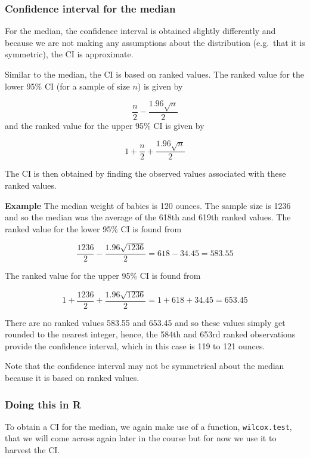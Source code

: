 \documentclass[
  oneside]{krantz}
\begin{document}
\hypertarget{confidence-interval-for-the-median}{%
\subsubsection{Confidence interval for the median}\label{confidence-interval-for-the-median}}

For the median, the confidence interval is obtained slightly differently and because we are not making any assumptions about the distribution (e.g.~that it is symmetric), the CI is approximate.

Similar to the median, the CI is based on ranked values. The ranked value for the lower 95\% CI (for a sample of size \(n\)) is given by

\[\frac{n}{2} - \frac{1.96 \sqrt{n}}{2}\]
and the ranked value for the upper 95\% CI is given by

\[1 + \frac{n}{2} + \frac{1.96 \sqrt{n}}{2}\]

The CI is then obtained by finding the observed values associated with these ranked values.

\textbf{Example} The median weight of babies is 120 ounces. The sample size is 1236 and so the median was the average of the 618th and 619th ranked values. The ranked value for the lower 95\% CI is found from

\[\frac{1236}{2} - \frac{1.96 \sqrt{1236}}{2} = 618 - 34.45 = 583.55\]

The ranked value for the upper 95\% CI is found from

\[1 + \frac{1236}{2} + \frac{1.96 \sqrt{1236}}{2} = 1 + 618 + 34.45 = 653.45\]

There are no ranked values 583.55 and 653.45 and so these values simply get rounded to the nearest integer, hence, the 584th and 653rd ranked observations provide the confidence interval, which in this case is 119 to 121 ounces.

Note that the confidence interval may not be symmetrical about the median because it is based on ranked values.

\hypertarget{doing-this-in-r-11}{%
\subsubsection{Doing this in R}\label{doing-this-in-r-11}}

To obtain a CI for the median, we again make use of a function, \texttt{wilcox.test}, that we will come across again later in the course but for now we use it to harvest the CI.
\end{document}
